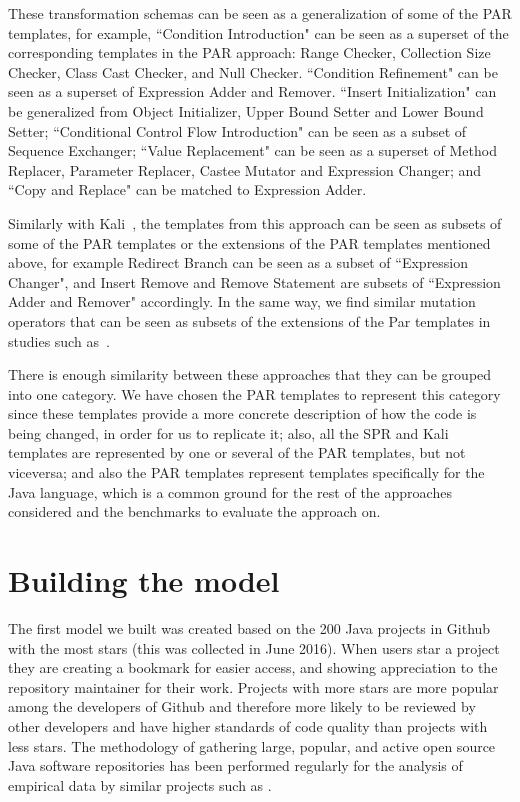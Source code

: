\documentclass[conference]{IEEEtran}
\begin{document}
These transformation schemas can be seen as a generalization of some of the PAR 
templates, for example, ``Condition Introduction" can be seen as a superset of 
the corresponding templates in the PAR approach: Range Checker, Collection Size 
Checker, Class Cast Checker, and Null Checker. ``Condition Refinement" can be 
seen as a superset of 
Expression Adder and Remover. ``Insert Initialization" can be 
generalized from Object Initializer, Upper Bound Setter and Lower Bound Setter; ``Conditional Control Flow Introduction" can be 
seen as a subset of Sequence Exchanger;
``Value Replacement" can be seen as a superset of Method 
Replacer, Parameter Replacer, Castee Mutator and Expression Changer; and ``Copy 
and Replace" can be matched to Expression Adder. 

Similarly with Kali~\cite{Qi15}, the templates from this approach can be seen as subsets of some of the PAR templates or the extensions of the PAR templates mentioned above, for example Redirect Branch can be seen as a subset of ``Expression Changer", and Insert Remove and Remove Statement are subsets of ``Expression Adder and Remover" accordingly. In the same way, we find similar mutation operators that can be seen as subsets of the extensions of the Par templates in studies such as~\cite{Offutt96,Offutt06}.

There is enough similarity between these approaches that they can be grouped 
into one category. We have chosen the PAR templates to represent this category 
since these templates provide a more concrete description of how the code is 
being changed, in order for us to replicate it; also, all the SPR and Kali templates are represented by one or several of the PAR templates, but not viceversa; and also the PAR templates represent templates specifically for the Java language, which is a common ground for the rest of the 
approaches considered and the benchmarks to evaluate the approach on.



\section{Building the model}
The first model we built was created based on the 200 Java projects in Github 
with the most stars (this was collected in June 2016). When users star a project they are creating a bookmark for 
easier access, and showing appreciation to the repository maintainer for their 
work. Projects with more stars are more popular among the developers of Github 
and therefore more likely to be reviewed by other developers and have higher 
standards of code quality than projects with less stars. The methodology of 
gathering large,
popular, and active open source Java software repositories has been performed 
regularly for the analysis of empirical data by similar projects such as 
\cite{Ray14}. 
\end{document}
